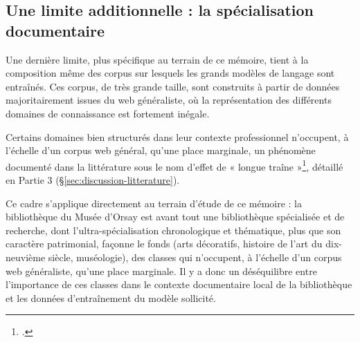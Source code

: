 \subsection{Une limite additionnelle : la spécialisation documentaire }
\label{sec:limites-specialisation}

Une dernière limite, plus spécifique au terrain de ce mémoire, tient à la composition même des corpus sur lesquels les grands modèles de langage sont entraînés. Ces corpus, de très grande taille, sont construits à partir de données majoritairement issues du web généraliste, où la représentation des différents domaines de connaissance est fortement inégale.

Certains domaines bien structurés dans leur contexte professionnel n'occupent, à l'échelle d'un corpus web général, qu'une place marginale, un phénomène documenté dans la littérature sous le nom d'effet de « longue traîne »\footcite{kandpal2023,badhe2026}, détaillé en Partie 3 (\S\ref{sec:discussion-litterature}).

Ce cadre s'applique directement au terrain d'étude de ce mémoire : la bibliothèque du Musée d'Orsay est avant tout une bibliothèque spécialisée et de recherche, dont l'ultra-spécialisation chronologique et thématique, plus que son caractère patrimonial, façonne le fonds (arts décoratifs, histoire de l'art du dix-neuvième siècle, muséologie), des classes qui n'occupent, à l'échelle d'un corpus web généraliste, qu'une place marginale. Il y a donc un déséquilibre entre l'importance de ces classes dans le contexte documentaire local de la bibliothèque et les données d'entraînement du modèle sollicité.

